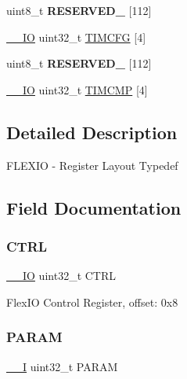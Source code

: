 \begin{DoxyCompactItemize}
uint8\+\_\+t {\bfseries R\+E\+S\+E\+R\+V\+E\+D\+\_} \mbox{[}112\mbox{]}
\item 
\mbox{\hyperlink{core__cm0plus_8h_aec43007d9998a0a0e01faede4133d6be}{\+\_\+\+\_\+\+IO}} uint32\+\_\+t \mbox{\hyperlink{struct_f_l_e_x_i_o___type_ac8695d9b76d42aa68666790a03bbaed0}{T\+I\+M\+C\+FG}} \mbox{[}4\mbox{]}
\item 
\mbox{\label{struct_f_l_e_x_i_o___type_ab7f1b68e49df3c1c12984c27bd170ac7}} 
uint8\+\_\+t {\bfseries R\+E\+S\+E\+R\+V\+E\+D\+\_} \mbox{[}112\mbox{]}
\item 
\mbox{\hyperlink{core__cm0plus_8h_aec43007d9998a0a0e01faede4133d6be}{\+\_\+\+\_\+\+IO}} uint32\+\_\+t \mbox{\hyperlink{struct_f_l_e_x_i_o___type_a0424c3da4002abfd507bb0264af58dcc}{T\+I\+M\+C\+MP}} \mbox{[}4\mbox{]}
\end{DoxyCompactItemize}


\subsection{Detailed Description}
F\+L\+E\+X\+IO -\/ Register Layout Typedef 

\subsection{Field Documentation}
\mbox{\label{struct_f_l_e_x_i_o___type_a15fc8d35f045f329b80c544bef35ff64}} 
\subsubsection{\texorpdfstring{CTRL}{CTRL}}
{\footnotesize\ttfamily \mbox{\hyperlink{core__cm0plus_8h_aec43007d9998a0a0e01faede4133d6be}{\+\_\+\+\_\+\+IO}} uint32\+\_\+t C\+T\+RL}

Flex\+IO Control Register, offset\+: 0x8 \mbox{\label{struct_f_l_e_x_i_o___type_a96563b10e1e91f05203f88047408044a}} 
\subsubsection{\texorpdfstring{PARAM}{PARAM}}
{\footnotesize\ttfamily \mbox{\hyperlink{core__cm0plus_8h_af63697ed9952cc71e1225efe205f6cd3}{\+\_\+\+\_\+I}} uint32\+\_\+t P\+A\+R\+AM}

